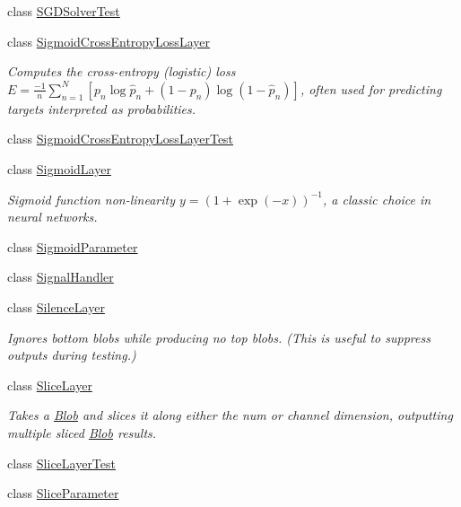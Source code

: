 \begin{DoxyCompactItemize}
class \mbox{\hyperlink{classcaffe_1_1_s_g_d_solver_test}{S\+G\+D\+Solver\+Test}}
\item 
class \mbox{\hyperlink{classcaffe_1_1_sigmoid_cross_entropy_loss_layer}{Sigmoid\+Cross\+Entropy\+Loss\+Layer}}
\begin{DoxyCompactList}\small\item\em Computes the cross-\/entropy (logistic) loss $ E = \frac{-1}{n} \sum\limits_{n=1}^N \left[ p_n \log \hat{p}_n + (1 - p_n) \log(1 - \hat{p}_n) \right] $, often used for predicting targets interpreted as probabilities. \end{DoxyCompactList}\item 
class \mbox{\hyperlink{classcaffe_1_1_sigmoid_cross_entropy_loss_layer_test}{Sigmoid\+Cross\+Entropy\+Loss\+Layer\+Test}}
\item 
class \mbox{\hyperlink{classcaffe_1_1_sigmoid_layer}{Sigmoid\+Layer}}
\begin{DoxyCompactList}\small\item\em Sigmoid function non-\/linearity $ y = (1 + \exp(-x))^{-1} $, a classic choice in neural networks. \end{DoxyCompactList}\item 
class \mbox{\hyperlink{classcaffe_1_1_sigmoid_parameter}{Sigmoid\+Parameter}}
\item 
class \mbox{\hyperlink{classcaffe_1_1_signal_handler}{Signal\+Handler}}
\item 
class \mbox{\hyperlink{classcaffe_1_1_silence_layer}{Silence\+Layer}}
\begin{DoxyCompactList}\small\item\em Ignores bottom blobs while producing no top blobs. (This is useful to suppress outputs during testing.) \end{DoxyCompactList}\item 
class \mbox{\hyperlink{classcaffe_1_1_slice_layer}{Slice\+Layer}}
\begin{DoxyCompactList}\small\item\em Takes a \mbox{\hyperlink{classcaffe_1_1_blob}{Blob}} and slices it along either the num or channel dimension, outputting multiple sliced \mbox{\hyperlink{classcaffe_1_1_blob}{Blob}} results. \end{DoxyCompactList}\item 
class \mbox{\hyperlink{classcaffe_1_1_slice_layer_test}{Slice\+Layer\+Test}}
\item 
class \mbox{\hyperlink{classcaffe_1_1_slice_parameter}{Slice\+Parameter}}
\item 

\end{DoxyCompactItemize}
